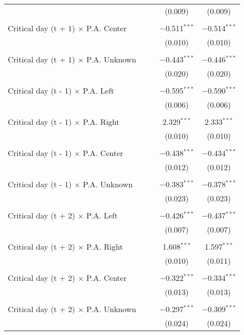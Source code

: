 \documentclass[
]{article}
\begin{document}
\begin{table}[!htbp]
{\begin{tabular}{@{\extracolsep{5pt}}lcccc}
  &  &  & (0.009) & (0.009) \\ 
  & & & & \\ 
 Critical day (t + 1) $\times$ P.A. Center &  &  & $-$0.511$^{***}$ & $-$0.514$^{***}$ \\ 
  &  &  & (0.010) & (0.010) \\ 
  & & & & \\ 
 Critical day (t + 1) $\times$ P.A. Unknown &  &  & $-$0.443$^{***}$ & $-$0.446$^{***}$ \\ 
  &  &  & (0.020) & (0.020) \\ 
  & & & & \\ 
 Critical day (t - 1) $\times$ P.A. Left &  &  & $-$0.595$^{***}$ & $-$0.590$^{***}$ \\ 
  &  &  & (0.006) & (0.006) \\ 
  & & & & \\ 
 Critical day (t - 1) $\times$ P.A. Right &  &  & 2.329$^{***}$ & 2.333$^{***}$ \\ 
  &  &  & (0.010) & (0.010) \\ 
  & & & & \\ 
 Critical day (t - 1) $\times$ P.A. Center &  &  & $-$0.438$^{***}$ & $-$0.434$^{***}$ \\ 
  &  &  & (0.012) & (0.012) \\ 
  & & & & \\ 
 Critical day (t - 1) $\times$ P.A. Unknown &  &  & $-$0.383$^{***}$ & $-$0.378$^{***}$ \\ 
  &  &  & (0.023) & (0.023) \\ 
  & & & & \\ 
 Critical day (t + 2) $\times$ P.A. Left &  &  & $-$0.426$^{***}$ & $-$0.437$^{***}$ \\ 
  &  &  & (0.007) & (0.007) \\ 
  & & & & \\ 
 Critical day (t + 2) $\times$ P.A. Right &  &  & 1.608$^{***}$ & 1.597$^{***}$ \\ 
  &  &  & (0.010) & (0.011) \\ 
  & & & & \\ 
 Critical day (t + 2) $\times$ P.A. Center &  &  & $-$0.322$^{***}$ & $-$0.334$^{***}$ \\ 
  &  &  & (0.013) & (0.013) \\ 
  & & & & \\ 
 Critical day (t + 2) $\times$ P.A. Unknown &  &  & $-$0.297$^{***}$ & $-$0.309$^{***}$ \\ 
  &  &  & (0.024) & (0.024) \\ 

\end{tabular}}
\end{table}
\end{document}
